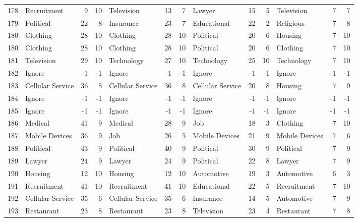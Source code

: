\begin{figure}[htbp]
\begin{tabular}{rlrrlrrlrrlrr}
    178   & Recruitment & 9     & 10    & Television & 13    & 7     & Lawyer & 15    & 5     & Television & 7     & 7 \\
    179   & Political & 22    & 8     & Insurance & 23    & 7     & Educational & 22    & 2     & Religious & 7     & 8 \\
    180   & Clothing & 28    & 10    & Clothing & 28    & 10    & Political & 20    & 6     & Housing & 7     & 10 \\
    180   & Clothing & 28    & 10    & Clothing & 28    & 10    & Political & 20    & 6     & Clothing & 7     & 10 \\
    181   & Television & 29    & 10    & Technology & 27    & 10    & Technology & 25    & 10    & Technology & 7     & 10 \\
    182   & Ignore & -1    & -1    & Ignore & -1    & -1    & Ignore & -1    & -1    & Ignore & -1    & -1 \\
    183   & Cellular Service & 36    & 8     & Cellular Service & 36    & 8     & Cellular Service & 20    & 8     & Housing & 7     & 9 \\
    184   & Ignore & -1    & -1    & Ignore & -1    & -1    & Ignore & -1    & -1    & Ignore & -1    & -1 \\
    185   & Ignore & -1    & -1    & Ignore & -1    & -1    & Ignore & -1    & -1    & Ignore & -1    & -1 \\
    186   & Medical & 41    & 9     & Medical & 28    & 9     & Job   & 18    & 3     & Clothing & 7     & 10 \\
    187   & Mobile Devices & 36    & 9     & Job   & 26    & 5     & Mobile Devices & 21    & 9     & Mobile Devices & 7     & 6 \\
    188   & Political & 43    & 9     & Political & 40    & 9     & Political & 30    & 9     & Political & 7     & 9 \\
    189   & Lawyer & 24    & 9     & Lawyer & 24    & 9     & Political & 22    & 8     & Lawyer & 7     & 9 \\
    190   & Housing & 12    & 10    & Housing & 12    & 10    & Automotive & 19    & 3     & Automotive & 6     & 3 \\
    191   & Recruitment & 41    & 10    & Recruitment & 41    & 10    & Educational & 22    & 5     & Recruitment & 7     & 10 \\
    192   & Cellular Service & 35    & 6     & Cellular Service & 35    & 6     & Insurance & 14    & 5     & Automotive & 7     & 9 \\
    193   & Restaurant & 23    & 8     & Restaurant & 23    & 8     & Television & 23    & 4     & Restaurant & 7     & 8 \\

\end{tabular}
\end{figure}
